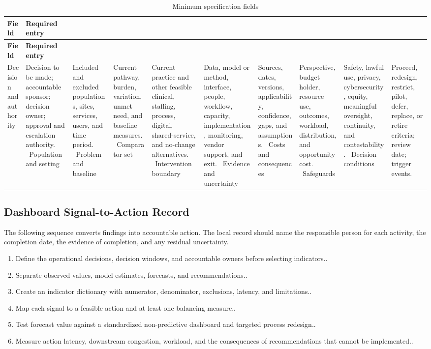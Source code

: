\begin{longtable}{@{}p{}p{}@{}}
\caption{Minimum specification fields}
\label{tab:comp-ch03-spec-fields}\\
\toprule
\textbf{Field} & \textbf{Required entry} \\
\midrule
\endfirsthead
\toprule
\textbf{Field} & \textbf{Required entry} \\
\midrule
\endhead
\bottomrule
\endlastfoot
Decision and authority & Decision to be made; accountable sponsor; decision owner; approval and escalation authority. \
Population and setting & Included and excluded populations, sites, services, users, and time period. \
Problem and baseline & Current pathway, burden, variation, unmet need, and baseline measures. \
Comparator set & Current practice and other feasible clinical, staffing, process, digital, shared-service, and no-change alternatives. \
Intervention boundary & Data, model or method, interface, people, workflow, capacity, implementation, monitoring, vendor support, and exit. \
Evidence and uncertainty & Sources, dates, versions, applicability, confidence, gaps, and assumptions. \
Costs and consequences & Perspective, budget holder, resource use, outcomes, workload, distribution, and opportunity cost. \
Safeguards & Safety, lawful use, privacy, cybersecurity, equity, meaningful oversight, continuity, and contestability. \
Decision conditions & Proceed, redesign, restrict, pilot, defer, replace, or retire criteria; review date; trigger events. \
\end{longtable}

\subsection{Dashboard Signal-to-Action Record}
\label{sec:comp-ch03-supp-2}
The following sequence converts findings into accountable action. The local record
should name the responsible person for each activity, the completion date, the
evidence of completion, and any residual uncertainty.

\begin{enumerate}
 \item Define the operational decisions, decision windows, and accountable owners before selecting indicators..
 \item Separate observed values, model estimates, forecasts, and recommendations..
 \item Create an indicator dictionary with numerator, denominator, exclusions, latency, and limitations..
 \item Map each signal to a feasible action and at least one balancing measure..
 \item Test forecast value against a standardized non-predictive dashboard and targeted process redesign..
 \item Measure action latency, downstream congestion, workload, and the consequences of recommendations that cannot be implemented..
\end{enumerate}


